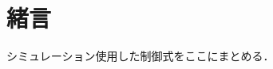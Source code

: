 \documentclass[11pt,a4paper]{jsarticle}
\def\user{1000}
\def\rlsSimulator{/usr/local/etc/rls/user/\user/rlsSimulator}
\def\result{\rlsSimulator/sl/result}
\begin{document}
\header

\section{緒言}
シミュレーション使用した制御式をここにまとめる．






\newpage


%
%
\end{document}
